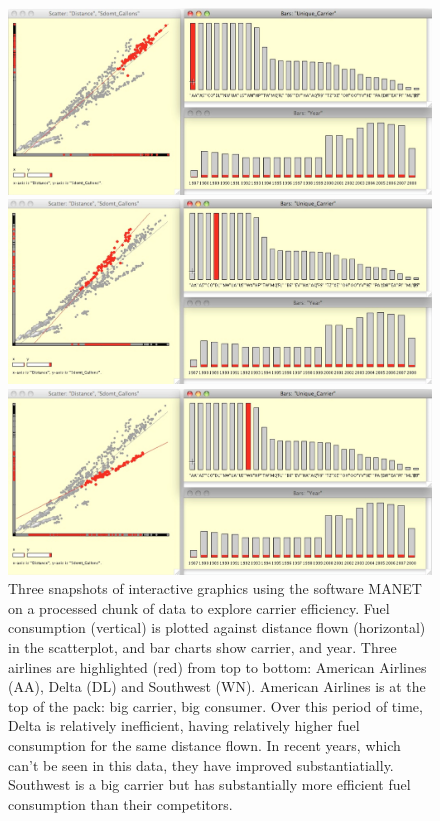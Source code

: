 \documentclass{article}
\begin{document}
\begin{figure}[p]
\centerline{\includegraphics[width=5in]{images/airline-manet1.png}}
\smallskip
\centerline{\includegraphics[width=5in]{images/airline-manet2.png}}
\smallskip
\centerline{\includegraphics[width=5in]{images/airline-manet3.png}}
\caption{Three snapshots of interactive graphics using the software MANET on a processed chunk of data to explore carrier efficiency. Fuel consumption (vertical) is plotted against distance flown (horizontal) in the scatterplot, and bar charts show carrier, and year. Three airlines are highlighted (red) from top to bottom: American Airlines (AA), Delta (DL) and Southwest (WN). American Airlines is at the top of the pack: big carrier, big consumer. Over this period of time, Delta is relatively inefficient, having relatively higher fuel consumption for the same distance flown. In recent years, which can't be seen in this data, they have improved substantiatially. Southwest is a big carrier but has substantially more efficient fuel consumption than their competitors.}
\label{carrier-efficiency}
\end{figure}
\end{document}
